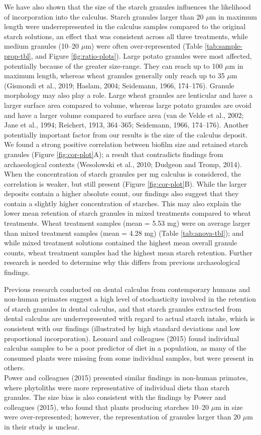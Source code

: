 \documentclass[utf8]{frontiers/frontiersSCNS}
\begin{document}
We have also shown that the size of the starch granules influences the likelihood
of incorporation into the calculus. Starch granules larger than 20 \(\mu\)m in
maximum length were underrepresented in the calculus samples compared to the original
starch solutions, an effect that was consistent across all three treatments,
while medium granules (10--20 \(\mu\)m) were often over-represented
(Table \ref{tab:sample-prop-tbl},
and
Figure \ref{fig:ratio-plots}).
Large potato granules were most affected, potentially because of the greater
size-range. They can reach up to 100 \(\mu\)m in maximum length, whereas wheat
granules generally only reach up to 35 \(\mu\)m
(Gismondi et al., 2019; Haslam, 2004; Seidemann, 1966, 174--176).
Granule morphology may also play a role. Large wheat granules
are lenticular and have a larger surface area compared
to volume, whereas large potato granules are ovoid and have a larger volume
compared to surface area
(van de Velde et al., 2002; Jane et al., 1994; Reichert, 1913, 364--365; Seidemann, 1966, 174--176).
Another potentially important factor
from our results is the size of the calculus deposit. We found a
strong positive correlation between biofilm size and retained
starch granules (Figure \ref{fig:cor-plot}A);
a result that contradicts findings from archaeological contexts
(Wesolowski et al., 2010; Dudgeon and Tromp, 2014).
When the concentration of starch granules
per mg calculus is considered, the correlation is weaker, but still present
(Figure \ref{fig:cor-plot}B).
While the larger deposits contain a higher absolute count, our findings also suggest
that they contain a slightly higher concentration of starches. This may also explain
the lower mean retention of starch granules in mixed treatments compared to
wheat treatments. Wheat treatment samples (mean = 5.53 mg) were on average larger than mixed treatment samples (mean = 4.28 mg) (Table \ref{tab:anova-tbl}); and while mixed treatment solutions contained the highest mean overall
granule counts, wheat treatment samples had the highest mean starch retention.
Further research is needed to determine why this differs from previous archaeological
findings.

Previous research conducted on dental calculus from contemporary humans and non-human
primates suggest a high level of stochasticity involved in the retention of
starch granules in dental calculus, and that starch granules extracted from dental
calculus are underrepresented with regard
to actual starch intake, which is consistent with our findings (illustrated by high
standard deviations and low proportional incorporation).
Leonard and colleagues (2015) found individual
calculus samples to be a poor predictor of diet in a population, as many of the
consumed plants were missing from some individual samples, but were present in others.\\
Power and colleagues (2015)
presented similar findings in non-human primates, where phytoliths were more
representative of individual diets than starch granules.
The size bias is also consistent with the findings by Power and colleagues
(2015),
who found that plants producing starches 10--20 \(\mu\)m in
size were over-represented; however, the representation of granules larger than
20 \(\mu\)m in their study is unclear.
\end{document}
